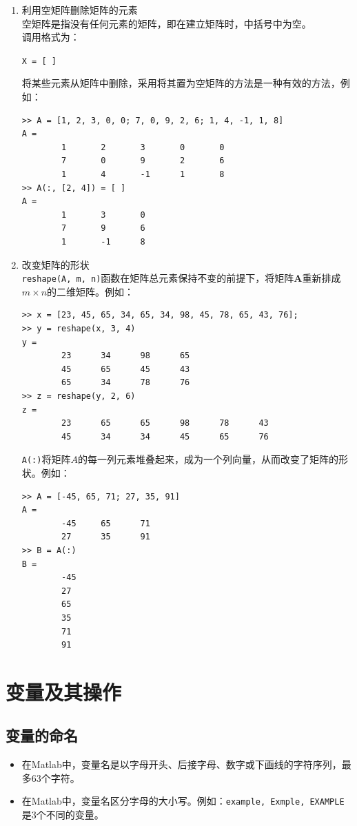 \begin{enumerate}
\item 利用空矩阵删除矩阵的元素\\
空矩阵是指没有任何元素的矩阵，即在建立矩阵时，中括号中为空。\\
调用格式为：
\begin{center}
	\lstinline|X = [ ]|
\end{center}
将某些元素从矩阵中删除，采用将其置为空矩阵的方法是一种有效的方法，例如：
\begin{lstlisting}
>> A = [1, 2, 3, 0, 0; 7, 0, 9, 2, 6; 1, 4, -1, 1, 8]
A = 
		1		2		3		0		0
		7		0		9		2		6
		1		4		-1		1		8
>> A(:, [2, 4]) = [ ]
A = 
		1		3		0
		7		9		6
		1		-1		8
\end{lstlisting}

\item 改变矩阵的形状\\
\lstinline|reshape(A, m, n)|函数在矩阵总元素保持不变的前提下，将矩阵$\bm{A}$重新排成$m \times n$的二维矩阵。例如：
\begin{lstlisting}
>> x = [23, 45, 65, 34, 65, 34, 98, 45, 78, 65, 43, 76];
>> y = reshape(x, 3, 4)
y = 
		23		34		98		65
		45		65		45		43
		65		34		78		76
>> z = reshape(y, 2, 6)
z = 
		23		65		65		98		78		43
		45		34		34		45		65		76
\end{lstlisting}
\lstinline|A(:)|将矩阵$A$的每一列元素堆叠起来，成为一个列向量，从而改变了矩阵的形状。例如：
\begin{lstlisting}
>> A = [-45, 65, 71; 27, 35, 91]
A = 
		-45		65		71
		27		35		91
>> B = A(:)
B =
		-45
		27
		65
		35
		71
		91
\end{lstlisting}
\end{enumerate}

\section{变量及其操作}

\subsection{变量的命名}
\begin{itemize}
	\item 在Matlab中，变量名是以字母开头、后接字母、数字或下画线的字符序列，最多63个字符。
	\item 在Matlab中，变量名区分字母的大小写。例如：\lstinline|example, Exmple, EXAMPLE|是3个不同的变量。
\end{itemize}

